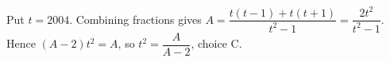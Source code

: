 Put $t=2004$. Combining fractions gives $A=\dfrac{t(t-1)+t(t+1)}{t^2-1}=\dfrac{2t^2}{t^2-1}$. Hence $(A-2)t^2=A$, so $\boxed{t^2=\dfrac{A}{A-2}}$, choice C.

